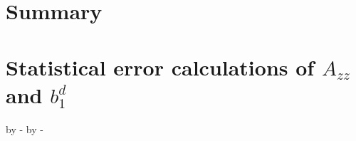 \documentclass[12pt]{article}
\begin{document}
\section{Summary}
  
\clearpage
\appendix
\section{Statistical error calculations of $A_{zz}$ and $b_1^d$}
%


\topmargin 0pt
\advance \topmargin by -\headheight
\advance \topmargin by -\headsep

\textheight 8.9in

\oddsidemargin 0pt
\evensidemargin \oddsidemargin
\marginparwidth 0.5in

\textwidth 6.5in
\clearpage
%

 
\end{document}
